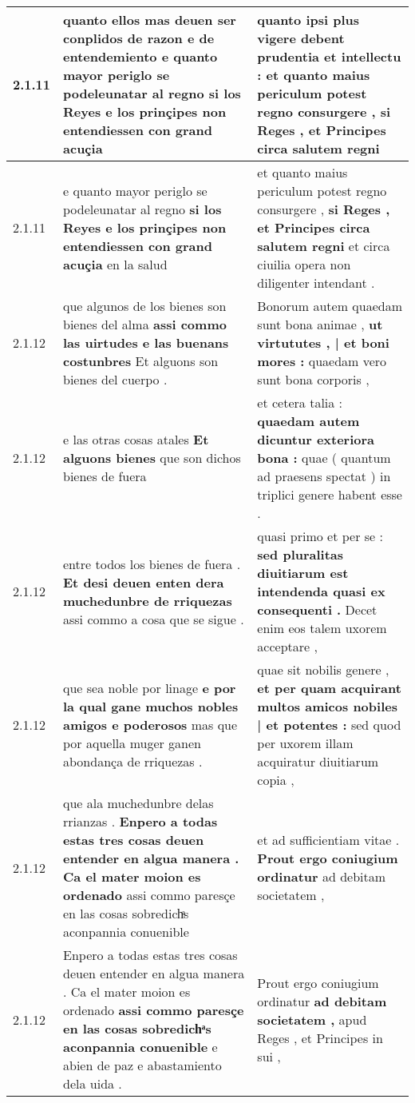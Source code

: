 \begin{tabular}{|p{1cm}|p{6.5cm}|p{6.5cm}|}
2.1.11 & quanto ellos mas deuen ser conplidos de razon e de entendemiento \textbf{ e quanto mayor periglo se podeleunatar al regno } si los Reyes e los prinçipes non entendiessen con grand acuçia & quanto ipsi plus vigere debent prudentia et intellectu : \textbf{ et quanto maius periculum potest regno consurgere , } si Reges , et Principes circa salutem regni \\\hline
2.1.11 & e quanto mayor periglo se podeleunatar al regno \textbf{ si los Reyes e los prinçipes non entendiessen con grand acuçia } en la salud & et quanto maius periculum potest regno consurgere , \textbf{ si Reges , et Principes circa salutem regni } et circa ciuilia opera non diligenter intendant . \\\hline
2.1.12 & que algunos de los bienes son bienes del alma \textbf{ assi commo las uirtudes e las buenans costunbres } Et alguons son bienes del cuerpo . & Bonorum autem quaedam sunt bona animae , \textbf{ ut virtututes , | et boni mores : } quaedam vero sunt bona corporis , \\\hline
2.1.12 & e las otras cosas atales \textbf{ Et alguons bienes } que son dichos bienes de fuera & et cetera talia : \textbf{ quaedam autem dicuntur exteriora bona : } quae ( quantum ad praesens spectat ) in triplici genere habent esse . \\\hline
2.1.12 & entre todos los bienes de fuera . \textbf{ Et desi deuen enten dera muchedunbre de rriquezas } assi commo a cosa que se sigue . & quasi primo et per se : \textbf{ sed pluralitas diuitiarum est intendenda quasi ex consequenti . } Decet enim eos talem uxorem acceptare , \\\hline
2.1.12 & que sea noble por linage \textbf{ e por la qual gane muchos nobles amigos e poderosos } mas que por aquella muger ganen abondança de rriquezas . & quae sit nobilis genere , \textbf{ et per quam acquirant multos amicos nobiles | et potentes : } sed quod per uxorem illam acquiratur diuitiarum copia , \\\hline
2.1.12 & que ala muchedunbre delas rrianzas . \textbf{ Enpero a todas estas tres cosas deuen entender en algua manera . Ca el mater moion es ordenado } assi commo paresçe en las cosas sobredichͣs aconpannia conuenible & et ad sufficientiam vitae . \textbf{ Prout ergo coniugium ordinatur } ad debitam societatem , \\\hline
2.1.12 & Enpero a todas estas tres cosas deuen entender en algua manera . Ca el mater moion es ordenado \textbf{ assi commo paresçe en las cosas sobredichͣs aconpannia conuenible } e abien de paz e abastamiento dela uida . & Prout ergo coniugium ordinatur \textbf{ ad debitam societatem , } apud Reges , et Principes in sui , \\\hline

\end{tabular}
